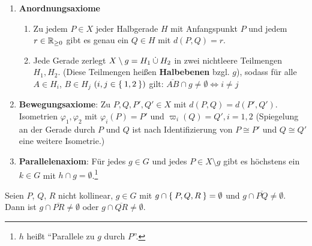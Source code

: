 \begin{definition}
    \begin{enumerate}[label=§\arabic*),ref=§\arabic*,start=3]
        \item \textbf{Anordnungsaxiome}\label{axiom:3}
            \begin{enumerate}[label=(\roman*),ref=§\theenumi{} (\roman*)]
                \item  Zu jedem $P \in X$ jeder Halbgerade $H$ mit \label{axiom:3.1}
                      Anfangspunkt $P$ und jedem $r \in \mathbb{R}_{\geq 0}$
                      gibt es genau ein $Q \in H$ mit $d(P,Q) = r$.
                \item Jede Gerade zerlegt $X \setminus g = H_1 \mathbin{\dot{\cup}} H_2$
                      in zwei nichtleere Teilmengen $H_1, H_2$.
                      (Diese Teilmengen heißen \textbf{Halbebenen} bzgl. $g$),
                      sodass für alle $A \in H_i$, $B \in H_j$
                      $(i,j \in \Set{1,2})$ gilt: $\overline{AB} \cap g \neq \emptyset \Leftrightarrow i \neq j$\label{axiom:3.2}
            \end{enumerate}
        \item \textbf{Bewegungsaxiome}: Zu $P, Q, P', Q' \in X$\label{axiom:4}
            mit $d(P,Q) = d(P', Q')$. Isometrien $\varphi_1, \varphi_2$
            mit $\varphi_i (P) = P'$ und $\varpi_i(Q) = Q', i=1,2$
            (Spiegelung an der Gerade durch $P$ und $Q$ ist nach 
             Identifizierung von $P \cong P'$ und $Q \cong Q'$ eine
             weitere Isometrie.)
        \item \textbf{Parallelenaxiom}: Für jedes $g \in G$ und jedes
            $P \in X \setminus g$ gibt es höchstens ein $k \in G$ mit
            $h \cap g = \emptyset$.\footnote{$h$ heißt \enquote{Parallele zu $g$ durch $P$}.}
    \end{enumerate}
\end{definition}



\begin{satz}\label{satz:rasch} %
    Seien $P$, $Q$, $R$ nicht kollinear, $g \in G$ mit $g \cap \Set{P, Q, R} = \emptyset$
    und $g \cap \overline{PQ} \neq \emptyset$. Dann ist
    $g \cap \overline{PR} \neq \emptyset$ oder $g \cap \overline{QR} \neq \emptyset$.
\end{satz}

